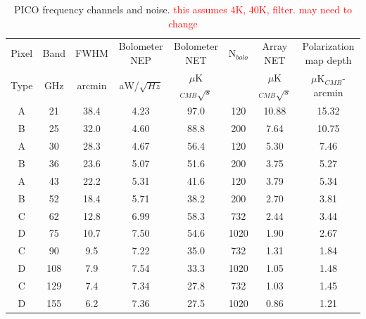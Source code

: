 \documentclass[]{spie}  %
\newcommand{\comr}[1]{\textcolor{red}{#1}}
\begin{document}
\begin{table}[ht]
\centering
\caption{PICO frequency channels and noise. \comr{this assumes 4K, 40K, filter. may need to change}}
\label{tab:noise}
\begin{tabular}{|c|c|c|c|c|c|c|c|}
\hline
Pixel  & Band  & FWHM   & Bolometer NEP & Bolometer NET        & N$_{bolo}$ & Array NET            & Polarization map depth  \\
Type   & GHz   & arcmin & aW/$\sqrt{Hz}$ & $\mu$K$_{CMB}\sqrt{s}$ &           & $\mu$K$_{CMB}\sqrt{s}$ & $\mu$K$_{CMB}$-arcmin      \\ \hline
A   & 21    & 38.4   & 4.23          & 97.0                 & 120         & 10.88                & 15.32                    \\
B   & 25    & 32.0   & 4.60          & 88.8                 & 200         & 7.64                 & 10.75                   \\
A   & 30    & 28.3   & 4.67          & 56.4                 & 120         & 5.30                 & 7.46                     \\
B   & 36    & 23.6   & 5.07          & 51.6                 & 200         & 3.75                 & 5.27                    \\
A   & 43    & 22.2   & 5.31          & 41.6                 & 120         & 3.79                 & 5.34                    \\
B   & 52    & 18.4   & 5.71          & 38.2                 & 200         & 2.70                 & 3.81                     \\
C   & 62    & 12.8   & 6.99          & 58.3                 & 732         & 2.44                 & 3.44                    \\
D   & 75    & 10.7   & 7.50          & 54.6                 & 1020        & 1.90                 & 2.67                   \\
C   & 90    & 9.5    & 7.22          & 35.0                 & 732         & 1.31                 & 1.84                     \\
D   & 108   & 7.9    & 7.54          & 33.3                 & 1020        & 1.05                 & 1.48                      \\
C   & 129   & 7.4    & 7.34          & 27.8                 & 732         & 1.03                 & 1.45                 \\
D   & 155   & 6.2    & 7.36          & 27.5                 & 1020        & 0.86                 & 1.21                    \\

\end{tabular}
\end{table}
\end{document}
